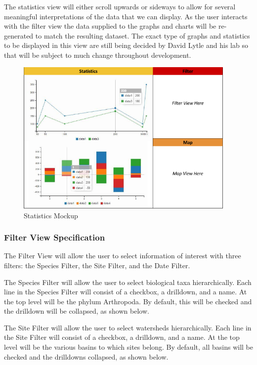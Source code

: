 The statistics view will either scroll upwards or sideways to allow for several meaningful interpretations of the data that we can display. As the user interacts with the filter view the data supplied to the graphs and charts will be re-generated to match the resulting dataset. The exact type of graphs and statistics to be displayed in this view are still being decided by David Lytle and his lab so that will be subject to much change throughout development. 

\begin{figure}[h]
	\centering
	\includegraphics[width=0.95\textwidth]{statistics_mockup.png}
	\captionsetup{justification=centering}
	\caption{
		Statistics Mockup
	}
	\label{fig:statistics_mockup}
\end{figure}

\subsubsection{Filter View Specification}
The Filter View will allow the user to select information of interest with three filters: the Species Filter, the Site Filter, and the Date Filter.

The Species Filter will allow the user to select biological taxa hierarchically. Each line in the Species Filter will consist of a checkbox, a drilldown, and a name. At the top level will be the phylum Arthropoda. By default, this will be checked and the drilldown will be collapsed, as shown below.

The Site Filter will allow the user to select watersheds hierarchically. Each line in the Site Filter will consist of a checkbox, a drilldown, and a name. At the top level will be the various basins to which sites belong. By default, all basins will be checked and the drilldowns collapsed, as shown below.

